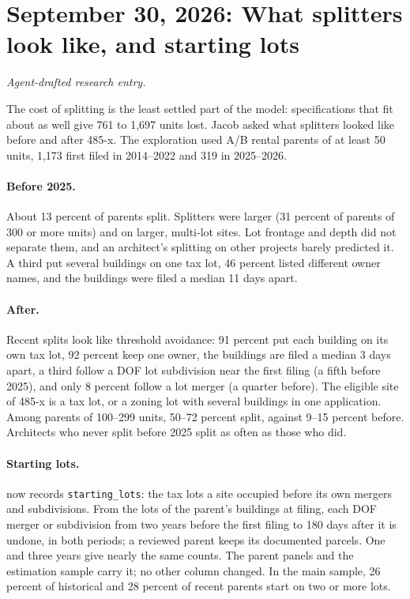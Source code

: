 \clearpage
\section*{September 30, 2026: What splitters look like, and starting lots}
\textit{Agent-drafted research entry.}

The cost of splitting is the least settled part of the model: specifications
that fit about as well give 761 to 1,697 units lost. Jacob asked what splitters
looked like before and after 485-x. The exploration used A/B rental parents of
at least 50 units, 1,173 first filed in 2014--2022 and 319 in 2025--2026.

\paragraph{Before 2025.} About 13 percent of parents split. Splitters were
larger (31 percent of parents of 300 or more units) and on larger, multi-lot
sites. Lot frontage and depth did not separate them, and an architect's
splitting on other projects barely predicted it. A third put several buildings
on one tax lot, 46 percent listed different owner names, and the buildings were
filed a median 11 days apart.

\paragraph{After.} Recent splits look like threshold avoidance: 91 percent put
each building on its own tax lot, 92 percent keep one owner, the buildings are
filed a median 3 days apart, a third follow a DOF lot subdivision near the first
filing (a fifth before 2025), and only 8 percent follow a lot merger (a quarter
before). The eligible site of 485-x is a tax lot, or a zoning lot with several
buildings in one application. Among parents of 100--299 units, 50--72 percent
split, against 9--15 percent before. Architects who never split before 2025
split as often as those who did.

\paragraph{Starting lots.}  now records
\texttt{starting\_lots}: the tax lots a site occupied before its own mergers and
subdivisions. From the lots of the parent's buildings at filing, each DOF merger
or subdivision from two years before the first filing to 180 days after it is
undone, in both periods; a reviewed parent keeps its documented parcels. One
and three years give nearly the same counts. The parent panels and the
estimation sample carry it; no other column changed. In the main sample, 26
percent of historical and 28 percent of recent parents start on two or more
lots.

